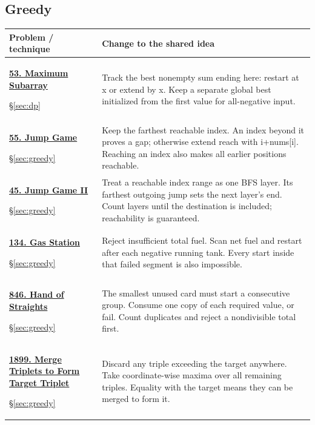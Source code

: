 \documentclass[11pt]{article}
\newcommand{\sect}[1]{\hyperref[sec:#1]{\S\ref*{sec:#1}}}
\begin{document}
\subsection{Greedy}
\begin{longtable}{@{}L{4.3cm}L{11.7cm}@{}}
\toprule Problem / technique & Change to the shared idea \\ \midrule\endhead
\hypertarget{lc53}{}\href{https://leetcode.com/problems/maximum-subarray/}{\textbf{53. Maximum Subarray}}\par\sect{dp} & Track the best nonempty sum ending here: restart at x or extend by x. Keep a separate global best initialized from the first value for all-negative input.\\[4pt]
\hypertarget{lc55}{}\href{https://leetcode.com/problems/jump-game/}{\textbf{55. Jump Game}}\par\sect{greedy} & Keep the farthest reachable index. An index beyond it proves a gap; otherwise extend reach with i+nums[i]. Reaching an index also makes all earlier positions reachable.\\[4pt]
\hypertarget{lc45}{}\href{https://leetcode.com/problems/jump-game-ii/}{\textbf{45. Jump Game II}}\par\sect{greedy} & Treat a reachable index range as one BFS layer. Its farthest outgoing jump sets the next layer's end. Count layers until the destination is included; reachability is guaranteed.\\[4pt]
\hypertarget{lc134}{}\href{https://leetcode.com/problems/gas-station/}{\textbf{134. Gas Station}}\par\sect{greedy} & Reject insufficient total fuel. Scan net fuel and restart after each negative running tank. Every start inside that failed segment is also impossible.\\[4pt]
\hypertarget{lc846}{}\href{https://leetcode.com/problems/hand-of-straights/}{\textbf{846. Hand of Straights}}\par\sect{greedy} & The smallest unused card must start a consecutive group. Consume one copy of each required value, or fail. Count duplicates and reject a nondivisible total first.\\[4pt]
\hypertarget{lc1899}{}\href{https://leetcode.com/problems/merge-triplets-to-form-target-triplet/}{\textbf{1899. Merge Triplets to Form Target Triplet}}\par\sect{greedy} & Discard any triple exceeding the target anywhere. Take coordinate-wise maxima over all remaining triples. Equality with the target means they can be merged to form it.\\[4pt]

\end{longtable}
\end{document}
